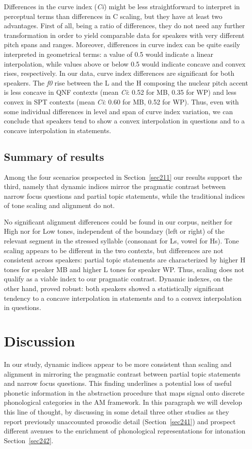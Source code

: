 Differences in the curve index (\textit{Ci}) might be less straightforward to interpret in perceptual terms than differences in C scaling, but they have at least two advantages. First of all, being a ratio of differences, they do not need any further transformation in order to yield comparable data for speakers with very different pitch spans and ranges. Moreover, differences in curve index can be quite easily interpreted in geometrical terms: a value of 0.5 would indicate a linear interpolation, while values above or below 0.5 would indicate concave and convex rises, respectively. 
In our data, curve index differences are significant for both speakers. The \textit{f0} rise between the L and the H composing the nuclear pitch accent is less concave in QNF contexts (mean \textit{Ci}: 0.52 for MB, 0.35 for WP) and less convex in SPT contexts (mean \textit{Ci}: 0.60 for MB, 0.52 for WP). Thus, even with some individual differences in level and span of curve index variation, we can conclude that speakers tend to show a convex interpolation in questions and to a concave interpolation in statements.

\subsection{Summary of results}\label{sec234}
Among the four scenarios prospected in Section~\ref{sec211} our results support the third, namely that dynamic indices mirror the pragmatic contrast between narrow focus questions and partial topic statements, while the traditional indices of tone scaling and alignment do not.

No significant alignment differences could be found in our corpus, neither for High nor for Low tones, independent of the boundary (left or right) of the relevant segment in the stressed syllable (consonant for Ls, vowel for Hs). Tone scaling appears to be different in the two contexts, but differences are not consistent across speakers: partial topic statements are characterized by higher H tones for speaker MB and higher L tones for speaker WP. Thus, scaling does not qualify as a viable index to our pragmatic contrast. Dynamic indexes, on the other hand, proved robust: both speakers showed a statistically significant tendency to a concave interpolation in statements and to a convex interpolation in questions. 

\section{Discussion}\label{sec24}
In our study, dynamic indices appear to be more consistent than scaling and alignment in mirroring the pragmatic contrast between partial topic statements and narrow focus questions. This finding underlines a potential loss of useful phonetic information in the abstraction procedure that maps  signal onto discrete phonological categories in the AM framework. In this paragraph we will develop this line of thought, by discussing in some detail three other studies as they report previously unaccounted prosodic detail (Section~\ref{sec241}) and prospect different avenues to the enrichment of phonological representations for intonation Section~\ref{sec242}.

